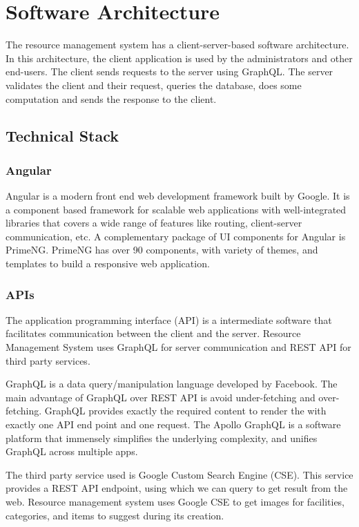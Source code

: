 \chapter{Software Architecture }
The resource management system has a client-server-based software architecture. In this architecture, the client application is used by the administrators and other end-users. The client sends requests to the server using GraphQL. The server validates the client and their request, queries the database, does some computation and sends the response to the client.
\section{Technical Stack}
\subsection{Angular}
Angular is a modern front end web development framework built by Google. It is a component based framework for scalable web applications with well-integrated libraries that covers a wide range of features like routing, client-server communication, etc. A complementary package of UI components for Angular is PrimeNG. PrimeNG has over 90 components, with variety of themes, and templates to build a responsive web application. 

\subsection{APIs}

The application programming interface (API) is a intermediate software that facilitates communication between the client and the server. Resource Management System uses GraphQL for server communication and REST API for third party services. 

GraphQL is a data query/manipulation language developed by Facebook. The main advantage of GraphQL over REST API is avoid under-fetching and over-fetching. GraphQL provides exactly the required content to render the with exactly one API end point and one request. The Apollo GraphQL is a software platform that immensely simplifies the underlying complexity, and unifies GraphQL across multiple apps.

The third party service used is Google Custom Search Engine (CSE). This service provides a REST API endpoint, using which we can query to get result from the web. Resource management system uses Google CSE to get images for facilities, categories, and items to suggest during its creation. 

